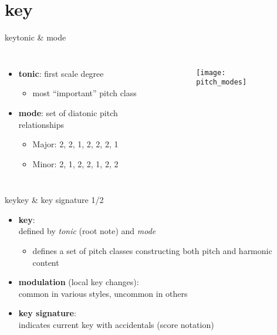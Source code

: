     \section{key}
        \begin{frame}{key}{tonic \& mode}
            \begin{columns}
            \begin{itemize}
                \item	\textbf{tonic}: first scale degree
                        \begin{itemize}
                            \item	most ``important'' pitch class
                        \end{itemize}
                
                \item	\textbf{mode}: set of diatonic pitch relationships
                        \begin{itemize}
                            \item	Major: 2, 2, 1, 2, 2, 2, 1
                            \item	Minor: 2, 1, 2, 2, 1, 2, 2
                        \end{itemize}
            \end{itemize}
                \vspace{-10mm}
                \begin{figure}[t]
                    \centering
                    \texttt{[image: pitch\_modes]}
                \end{figure}
            \end{columns}

        \end{frame}
        
        \begin{frame}{key}{key \& key signature 1/2}
            \begin{itemize}
                \item	\textbf{key}:\\ defined by \textit{tonic} (root note) and \textit{mode}
                        
                        \begin{itemize}
                            \item<1->	defines a set of pitch classes constructing both  pitch and harmonic content
                            
                        \end{itemize}
                \bigskip        
                \item<2->	\textbf{modulation} (local key changes):\\ common in various styles, uncommon in others
                \bigskip        
                \item<3->	\textbf{key signature}:\\ indicates current key with accidentals (score notation)
            \end{itemize}
        \end{frame}
        
